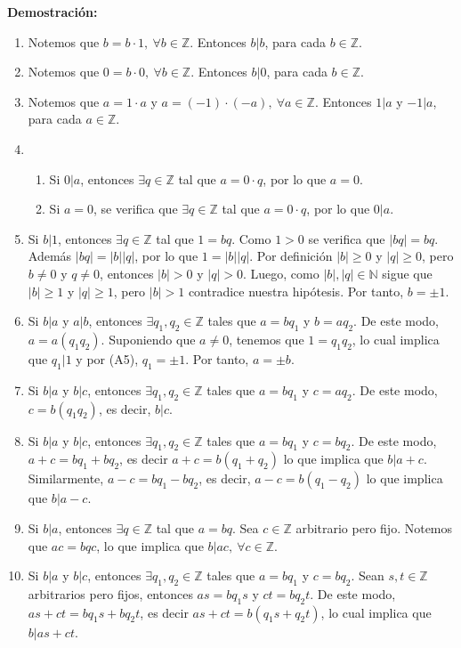 \documentclass[11pt]{article}
\newcommand{\N}{\mathbb{N}}
\newcommand{\Z}{\mathbb{Z}}
\begin{document}
\textbf{Demostración:}
\begin{enumerate}[label=P\arabic*.]
    \item Notemos que $b=b \cdot 1, \ \forall b\in \Z$. Entonces $b|b$, para cada $b \in \Z$.
    \item Notemos que $0=b \cdot 0, \ \forall b\in \Z$. Entonces $b|0$, para cada $b \in \Z$.
    \item Notemos que $a=1 \cdot a$ y $a = (-1) \cdot (-a), \ \forall a\in \Z$. Entonces $1|a$ y $-1|a$, para cada $a \in \Z$.
    \item 
      \begin{enumerate}[label=\roman*)]
      \item Si $0|a$, entonces $\exists q \in \Z$ tal que $a=0 \cdot q$, por lo que $a=0$.
      \item Si $a=0$, se verifica que $\exists q \in \Z$ tal que $a = 0 \cdot q$, por lo que $0|a$.
      \end{enumerate}
    \item Si $b|1$, entonces $\exists q \in \Z$ tal que $1 = bq$. Como $1>0$ se verifica que $|bq|=bq$. Además $|bq|=|b||q|$, por lo que $1 = |b||q|$. Por definición $|b| \geq 0$ y $|q| \geq 0$, pero $b \neq 0$ y $q \neq 0$, entonces $|b| > 0$ y $|q| > 0$. Luego, como $|b|,|q| \in \N$ sigue que $|b| \geq 1$ y $|q| \geq 1$, pero $|b| > 1$ contradice nuestra hipótesis. Por tanto, $b= \pm 1$.
    \item Si $b|a$ y $a|b$, entonces $\exists q_1, q_2 \in \Z$ tales que $a=bq_1$ y $b=aq_2$. De este modo, $a=a(q_1q_2)$. Suponiendo que $a \neq 0$, tenemos que $1=q_1q_2$, lo cual implica que $q_1|1$ y por (A5), $q_1= \pm 1$. Por tanto, $a= \pm b$.
    \item Si $b|a$ y $b|c$, entonces $\exists q_1,q_2 \in \Z$ tales que $a=bq_1$ y $c=aq_2$. De este modo, $c=b(q_1q_2)$, es decir, $b|c$.
    \item Si $b|a$ y $b|c$, entonces $\exists q_1,q_2 \in \Z$ tales que $a=bq_1$ y $c=bq_2$. De este modo, $a+c=bq_1+bq_2$, es decir $a+c=b(q_1+q_2)$ lo que implica que $b|a+c$. Similarmente, $a-c=bq_1-bq_2$, es decir, $a-c=b(q_1-q_2)$ lo que implica que $b|a-c$.
    \item Si $b|a$, entonces $\exists q \in \Z$ tal que $a=bq$. Sea $c \in \Z$ arbitrario pero fijo. Notemos que $ac=bqc$, lo que implica que $b|ac, \ \forall c \in \Z$.
    \item Si $b|a$ y $b|c$, entonces $\exists q_1,q_2 \in \Z$ tales que $a=bq_1$ y $c=bq_2$. Sean $s,t\in \Z$ arbitrarios pero fijos, entonces $as= bq_1s$ y $ct=bq_2t$. De este modo, $as+ct=bq_1s+bq_2t$, es decir $as+ct=b(q_1s+q_2t)$, lo cual implica que $b|as+ct$.

\end{enumerate}
\end{document}
